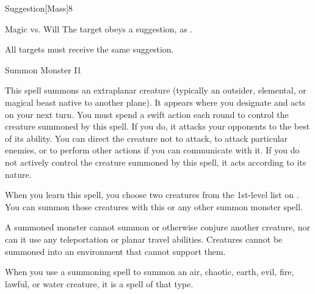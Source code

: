 \begin{spellsection}{Suggestion}[Mass]{8}
\begin{spellheader}
    \begin{spelltargetinginfo}
    \end{spelltargetinginfo}
\end{spellheader}
\begin{spellcontent}
    \begin{spelleffects}
        \begin{spellattack}{Magic vs. Will}
            \spelleffect The target obeys a suggestion, as .
        \end{spellattack}
        \spelldur \durmed
    \end{spelleffects}
\end{spellcontent}
\begin{spellfooter}
    \spellnotes All targets must receive the same suggestion.
\end{spellfooter}
\end{spellsection}

\begin{spellsection}{Summon Monster I}{1}\hypertarget{spell:summon monster}{}
\begin{spellheader}
\end{spellheader}
\begin{spellcontent}
    \spelleffect This spell summons an extraplanar creature (typically an outsider, elemental, or magical beast native to another plane). It appears where you designate and acts on your next turn. You must spend a swift action each round to control the creature summoned by this spell. If you do, it attacks your opponents to the best of its ability. You can direct the creature not to attack, to attack particular enemies, or to perform other actions if you can communicate with it. If you do not actively control the creature summoned by this spell, it acts according to its nature.
    \par When you learn this spell, you choose two creatures from the 1st-level list on . You can summon those creatures with this or any other summon monster spell.
    \par A summoned monster cannot summon or otherwise conjure another creature, nor can it use any teleportation or planar travel abilities. Creatures cannot be summoned into an environment that cannot support them.
    \par When you use a summoning spell to summon an air, chaotic, earth, evil, fire, lawful, or water creature, it is a spell of that type.
    \spelldur \durshort \dismissable
\end{spellcontent}
\begin{spellfooter}
\end{spellfooter}
\end{spellsection}

